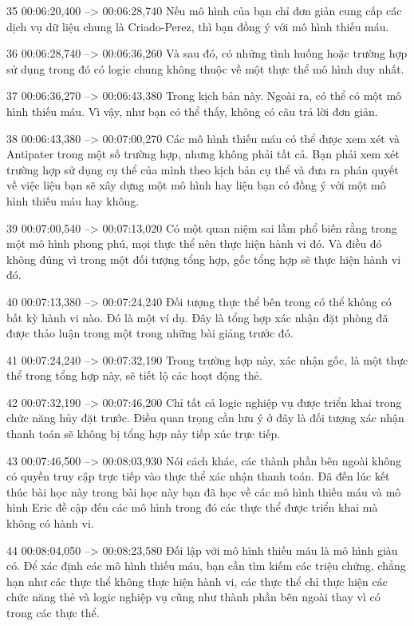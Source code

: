 35
00:06:20,400 --> 00:06:28,740
Nếu mô hình của bạn chỉ đơn giản cung cấp các dịch vụ dữ liệu chung là Criado-Perez, thì bạn đồng ý với mô hình thiếu máu.

36
00:06:28,740 --> 00:06:36,260
Và sau đó, có những tình huống hoặc trường hợp sử dụng trong đó có logic chung không thuộc về một thực thể mô hình duy nhất.

37
00:06:36,270 --> 00:06:43,380
Trong kịch bản này.  Ngoài ra, có thể có một mô hình thiếu máu.  Vì vậy, như bạn có thể thấy, không có câu trả lời đơn giản.

38
00:06:43,380 --> 00:07:00,270
Các mô hình thiếu máu có thể được xem xét và Antipater trong một số trường hợp, nhưng không phải tất cả.  Bạn phải xem xét trường hợp sử dụng cụ thể của mình theo kịch bản cụ thể và đưa ra phán quyết về việc liệu bạn sẽ xây dựng một mô hình hay liệu bạn có đồng ý với một mô hình thiếu máu hay không.

39
00:07:00,540 --> 00:07:13,020
Có một quan niệm sai lầm phổ biến rằng trong một mô hình phong phú, mọi thực thể nên thực hiện hành vi đó.  Và điều đó không đúng vì trong một đối tượng tổng hợp, gốc tổng hợp sẽ thực hiện hành vi đó.

40
00:07:13,380 --> 00:07:24,240
Đối tượng thực thể bên trong có thể không có bất kỳ hành vi nào.  Đó là một ví dụ.  Đây là tổng hợp xác nhận đặt phòng đã được thảo luận trong một trong những bài giảng trước đó.

41
00:07:24,240 --> 00:07:32,190
Trong trường hợp này, xác nhận gốc, là một thực thể trong tổng hợp này, sẽ tiết lộ các hoạt động thẻ.

42
00:07:32,190 --> 00:07:46,200
Chỉ tất cả logic nghiệp vụ được triển khai trong chức năng hủy đặt trước.  Điều quan trọng cần lưu ý ở đây là đối tượng xác nhận thanh toán sẽ không bị tổng hợp này tiếp xúc trực tiếp.

43
00:07:46,500 --> 00:08:03,930
Nói cách khác, các thành phần bên ngoài không có quyền truy cập trực tiếp vào thực thể xác nhận thanh toán.  Đã đến lúc kết thúc bài học này trong bài học này bạn đã học về các mô hình thiếu máu và mô hình Eric đề cập đến các mô hình trong đó các thực thể được triển khai mà không có hành vi.

44
00:08:04,050 --> 00:08:23,580
Đối lập với mô hình thiếu máu là mô hình giàu có.  Để xác định các mô hình thiếu máu, bạn cần tìm kiếm các triệu chứng, chẳng hạn như các thực thể không thực hiện hành vi, các thực thể chỉ thực hiện các chức năng thẻ và logic nghiệp vụ cũng như thành phần bên ngoài thay vì có trong các thực thể.

